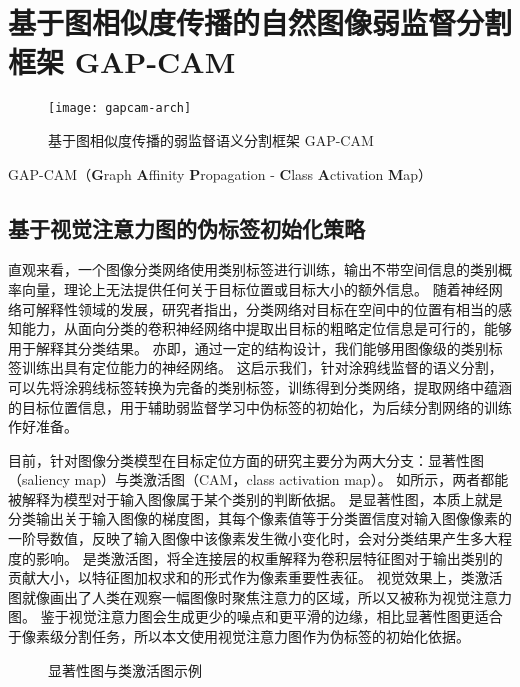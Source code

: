 \section{基于图相似度传播的自然图像弱监督分割框架 GAP-CAM}
\begin{figure}[h]
\centering
\texttt{[image: gapcam-arch]}
\caption{基于图相似度传播的弱监督语义分割框架 GAP-CAM}
\label{fig:gapcam-arch}
\end{figure}
GAP-CAM（\textbf{G}raph \textbf{A}ffinity \textbf{P}ropagation - \textbf{C}lass \textbf{A}ctivation \textbf{M}ap）
\subsection{基于视觉注意力图的伪标签初始化策略}
\label{subsec:cam}
直观来看，一个图像分类网络使用类别标签进行训练，输出不带空间信息的类别概率向量，理论上无法提供任何关于目标位置或目标大小的额外信息。
随着神经网络可解释性领域的发展，研究者指出，分类网络对目标在空间中的位置有相当的感知能力，从面向分类的卷积神经网络中提取出目标的粗略定位信息是可行的，能够用于解释其分类结果\cite{oquab2015object}。
亦即，通过一定的结构设计，我们能够用图像级的类别标签训练出具有定位能力的神经网络。
这启示我们，针对涂鸦线监督的语义分割，可以先将涂鸦线标签转换为完备的类别标签，训练得到分类网络，提取网络中蕴涵的目标位置信息，用于辅助弱监督学习中伪标签的初始化，为后续分割网络的训练作好准备。
\par
目前，针对图像分类模型在目标定位方面的研究主要分为两大分支：显著性图（saliency map）与类激活图（CAM，class activation map）。
如所示，两者都能被解释为模型对于输入图像属于某个类别的判断依据。
是显著性图，本质上就是分类输出关于输入图像的梯度图，其每个像素值等于分类置信度对输入图像像素的一阶导数值，反映了输入图像中该像素发生微小变化时，会对分类结果产生多大程度的影响\cite{simonyan2013deep}。
是类激活图，将全连接层的权重解释为卷积层特征图对于输出类别的贡献大小，以特征图加权求和的形式作为像素重要性表征\cite{zhou2016learning}。
视觉效果上，类激活图就像画出了人类在观察一幅图像时聚焦注意力的区域，所以又被称为视觉注意力图。
鉴于视觉注意力图会生成更少的噪点和更平滑的边缘，相比显著性图更适合于像素级分割任务，所以本文使用视觉注意力图作为伪标签的初始化依据。
\par
\begin{figure}[h]
\centering
{}
\hfil
{}
\hfil
{}
\caption{显著性图与类激活图示例}
\label{fig:saliency-cam}
\end{figure}
